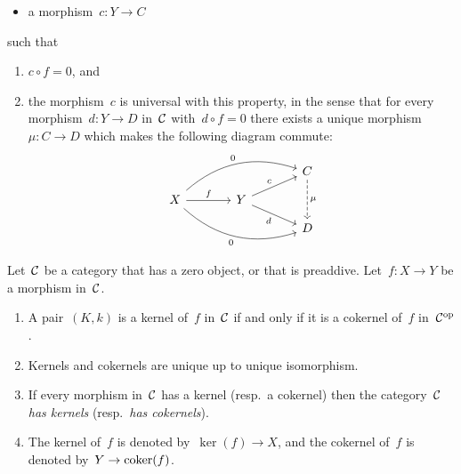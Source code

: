 \begin{definition}
\begin{enumerate}
\begin{itemize}
          \item
            a morphism~$c \colon Y \to C$
        \end{itemize}
        such that
        \begin{enumerate}[label=(C\arabic*)]
          \item
            $c \circ f = 0$, and
          \item
            the morphism~$c$ is universal with this property, in the sense that
            for every morphism~$d \colon Y \to D$ in~$\mathcal{C}$ with~$d \circ f = 0$ there exists a unique morphism~$\mu \colon C \to D$ which makes the following diagram commute:
            \[
              \begin{tikzcd}[row sep = small, column sep = large]
                  {}
                & {}
                & C
                  \arrow[dashed]{dd}[right]{\mu}
                \\
                  X
                  \arrow{r}[above]{f}
                  \arrow[bend left]{urr}[above left]{0}
                  \arrow[bend right]{drr}[below left]{0}
                & Y
                  \arrow{ur}[above left]{c}
                  \arrow{dr}[below left]{d}
                & {}
                \\
                  {}
                & {}
                & D
              \end{tikzcd}
            \]
        \end{enumerate}
  \end{enumerate}
\end{definition}


\begin{remark}
  Let~$\mathcal{C}$ be a category that has a zero object, or that is preaddive.
  Let~$f \colon X \to Y$ be a morphism in~$\mathcal{C}$.
  \begin{enumerate}
    \item
      A pair~$(K,k)$ is a kernel of~$f$ in~$\mathcal{C}$ if and only if it is a cokernel of~$f$ in~$\mathcal{C}^{\mathrm{op}}$.
    \item
      Kernels and cokernels are unique up to unique isomorphism.
    \item
      If every morphism in~$\mathcal{C}$ has a kernel (resp.\ a cokernel) then the category~$\mathcal{C}$ \emph{has kernels} (resp.\ \emph{has cokernels}).
    \item
      The kernel of~$f$ is denoted by~$\ker(f) \to X$, and the cokernel of~$f$ is denoted by~$Y \to \operatorname{coker}(f)$.
  \end{enumerate}
\end{remark}


